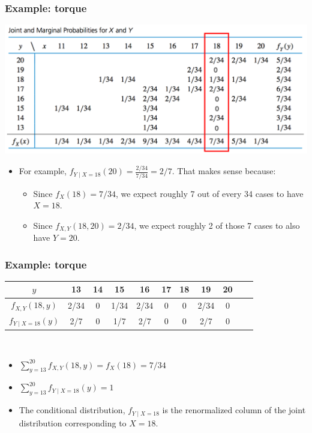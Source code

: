 \documentclass[handout]{beamer}\usepackage{graphicx, color}
\providecommand{\q}{$\quad$ \newline}
\numberwithin{equation}{section}
\begin{document}
\begin{frame}
\frametitle{Example: torque} \small
{} \includegraphics{../../fig/torquetablemar2.png}
\begin{itemize}
\pause \item For example, $f_{Y \mid X = 18}(20) = \frac{2/34}{7/34} = 2/7$. That makes sense because:
\begin{itemize}
\pause \item Since $f_{X}(18) = 7/34$, we expect roughly 7 out of every 34 cases to have $X = 18$.
\pause \item Since $f_{X, Y}(18, 20) = 2/34$, we expect roughly 2 of those 7 cases to also have $Y = 20$.
\end{itemize}
\end{itemize}
\end{frame}

\begin{frame}
\frametitle{Example: torque} \small
\begin{tabular}{ccccccccccc}
$y$ & 13 & 14 & 15 & 16 & 17 & 18 & 19 & 20 \\ \hline
$f_{X, Y}(18, y)$ & 2/34 & 0 & 1/34 & 2/34 & 0 & 0 & 2/34 & 0 \\
$f_{Y \mid X = 18}(y)$ & 2/7 & 0 & 1/7 & 2/7 & 0 & 0 & 2/7 & 0
\end{tabular} \q
\begin{itemize}
\pause \item $\sum_{y = 13}^{20} f_{X, Y}(18, y) = f_{X}(18) = 7/34$ 
\pause \item $\sum_{y = 13}^{20}f_{Y \mid X = 18}(y) = 1$
\pause \item The conditional distribution, $f_{Y \mid X = 18}$ is the renormalized column of the joint distribution corresponding to $X = 18$.
\end{itemize}
\end{frame}
\end{document}
